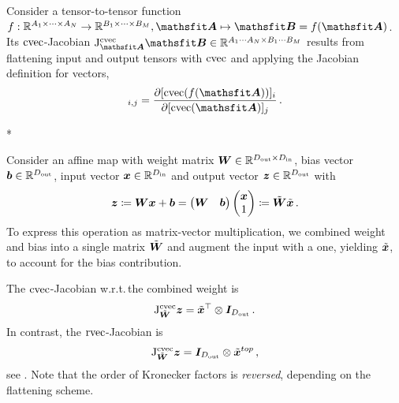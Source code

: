 \begin{paracol}{2}
  \begin{definition}
    Consider a tensor-to-tensor function $f: \sR^{A_1 \times \dots \times A_N} \to \sR^{B_1 \times \dots \times B_M}, \tA \mapsto \tB = f(\tA)$. Its $\operatorname{cvec}$-Jacobian $\jac^{\cvec}_{\tA}\tB \in \sR^{A_1 \cdots A_N \times B_1 \cdots B_M}$ results from flattening input and output tensors with $\operatorname{cvec}$ and applying the Jacobian definition for vectors,
    \begin{align*}
      [\jac^{\cvec}_{\tA}\tB]_{i,j}
      =
      \frac{\partial [\cvec(f(\tA))]_i}{\partial [\cvec(\tA)]_j}\,.
    \end{align*}
  \end{definition}

  \switchcolumn[1]


  \switchcolumn[1]*
  \switchcolumn[0]

  \begin{example}
    Consider an affine map with weight matrix ${\bm{W}} \in {\mathbb{R}}^{D_{\text{out}} \times D_{\text{in}}}$, bias vector ${\bm{b}} \in {\mathbb{R}}^{D_{\text{out}}}$, input vector ${\bm{x}} \in {\mathbb{R}}^{D_{\text{in}}}$ and output vector ${\bm{z}} \in {\mathbb{R}}^{D_{\text{out}}}$ with
    \begin{align*}
      {\bm{z}}
      \coloneqq
      {\bm{W}} {\bm{x}} + {\bm{b}}
      =
      \begin{pmatrix}
        {\bm{W}} & {\bm{b}}
      \end{pmatrix}
      \begin{pmatrix}
        {\bm{x}} \\ 1
      \end{pmatrix}
      \coloneqq
      \tilde{{\bm{W}}}
      \tilde{{\bm{x}}}\,.
    \end{align*}
    To express this operation as matrix-vector multiplication, we combined weight and bias into a single matrix $\tilde{{\bm{W}}}$ and augment the input with a one, yielding $\tilde{{\bm{x}}}$, to account for the bias contribution.

    The $\operatorname{cvec}$-Jacobian w.r.t.\,the combined weight is
    \begin{align*}
      \mathrm{J}^{\operatorname{cvec}}_{\tilde{{\bm{W}}}}{\bm{z}}
      =
      \tilde{{\bm{x}}}^{\top}
      \otimes
      {\bm{I}}_{D_{\text{out}}}\,.
    \end{align*}
    In contrast, the $\operatorname{rvec}$-Jacobian is
    \begin{align*}
      \mathrm{J}^{\operatorname{cvec}}_{\tilde{{\bm{W}}}}{\bm{z}}
      =
      {\bm{I}}_{D_{\text{out}}}
      \otimes
      \tilde{{\bm{x}}}^{top}\,,
    \end{align*}
    see .
    Note that the order of Kronecker factors is \emph{reversed}, depending on the flattening scheme.
  \end{example}


\end{paracol}
